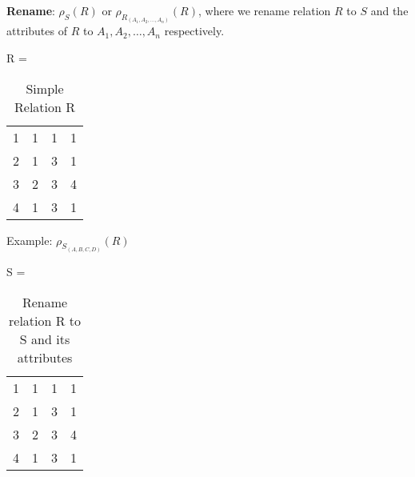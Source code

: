 \documentclass{article}
\begin{document}
  
  \begin{outline}
  
       \1 \textbf{Rename}: $\rho_S(R)$ or $\rho_R_{(A_1, A_2, \dots, A_n)}(R)$, where  we rename relation $R$ to $S$ and the attributes of $R$ to $A_1, A_2, \dots, A_n$ respectively.  
       
       
       

 
\begin{table}[h!]
\caption{Simple Relation R}
\begin{center}

R = \begin{tabular}{|c|c|c|c|}
   \hline
  \cellcolor{excel}{$A_1$}  & \cellcolor{excel}{$A_2$}  &   \cellcolor{excel}{$A_3$}
&  \cellcolor{excel}{$A_4$}  \\
  \hline
  1 & 1 & 1  &   1 \\
      \hline
  2 & 1 & 3  &   1 \\
      \hline
  3 & 2 & 3  &   4 \\
      \hline
  4 & 1 & 3  &   1 \\
      \hline
   
\end{tabular}
\end{center}
\label{tab:flatfile}
\end{table}%

\begin{example}
Example: $\rho_S_{(A,B,C,D)}(R)$



\begin{table}[h!]
\caption{Rename relation R to S and its attributes}
\begin{center}

S = \begin{tabular}{|c|c|c|c|}
   \hline
  \cellcolor{excel}{$A$}  & \cellcolor{excel}{$B$}  &   \cellcolor{excel}{$C$}
&  \cellcolor{excel}{$D$}  \\
  \hline
  1 & 1 & 1  &   1 \\
      \hline
  2 & 1 & 3  &   1 \\
      \hline
  3 & 2 & 3  &   4 \\
      \hline
  4 & 1 & 3  &   1 \\
      \hline
   
\end{tabular}
\end{center}
\label{tab:flatfile}
\end{table}%


\end{example}
\end{outline}
\end{document}

